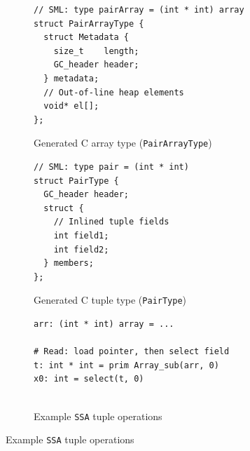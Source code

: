 \begin{figure}[H]
  \centering
  \begin{subfigure}[t]{0.48\textwidth}
    \caption{Generated C array type (\texttt{PairArrayType})}
    \label{fig:array_c_array_type}
    \vspace{1mm}
\begin{verbatim}
// SML: type pairArray = (int * int) array
struct PairArrayType {
  struct Metadata {
    size_t    length;
    GC_header header;
  } metadata;
  // Out-of-line heap elements
  void* el[];
};
\end{verbatim}
  \end{subfigure}\hfill
  \begin{subfigure}[t]{0.48\textwidth}
    \caption{Generated C tuple type (\texttt{PairType})}
    \label{fig:array_c_tuple_type}
    \vspace{1mm}
\begin{verbatim}
// SML: type pair = (int * int)
struct PairType {
  GC_header header;
  struct {
    // Inlined tuple fields
    int field1;
    int field2;
  } members;
};
\end{verbatim}
  \end{subfigure}

  \vspace{3mm}

  \begin{subfigure}[t]{0.46\textwidth}
    \caption{Example \texttt{SSA} tuple operations}
    \label{fig:array_ssa_ops}
    \vspace{1mm}
\begin{verbatim}
arr: (int * int) array = ...

# Read: load pointer, then select field
t: int * int = prim Array_sub(arr, 0)
x0: int = select(t, 0)


\end{verbatim}
\end{subfigure}
\end{figure}
